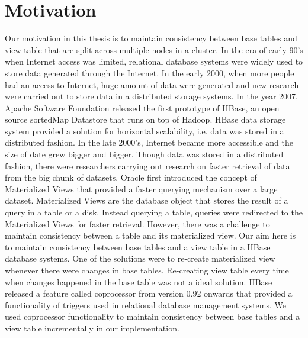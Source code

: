 \documentclass[11pt,a4paper,bibtotoc,idxtotoc,headsepline,footsepline,footexclude,BCOR12mm,DIV13]{scrbook}
\begin{document}

\section{Motivation}
\label{Motivation}

Our motivation in this thesis is to maintain consistency between base tables and view table that are split across multiple nodes in a cluster. In the era of early 90's when Internet access was limited, relational database systems were widely used to store data generated through the Internet. In the early 2000, when more people had an access to Internet, huge amount of data were generated and new research were carried out to store data in a distributed storage systems. In the year 2007, Apache Software Foundation released the first prototype of HBase, an open source sortedMap Datastore that runs on top of Hadoop. HBase data storage system provided a solution for horizontal scalability, i.e. data was stored in a distributed fashion. In the late 2000's, Internet became more accessible and the size of date grew bigger and bigger. Though data was stored in a distributed fashion, there were researchers carrying out research on faster retrieval of data from the big chunk of datasets. Oracle first introduced the concept of Materialized Views that provided a faster querying mechanism over a large dataset. Materialized Views are the database object that stores the result of a query in a
table or a disk. Instead querying a table, queries were redirected to the Materialized Views for faster retrieval. However, there was a challenge to maintain consistency between a table and its materialized view. Our aim here is to maintain consistency between base tables and a view table in a HBase database systems. One of the solutions were to re-create materialized view whenever there were changes in base tables. Re-creating view table every  time when changes happened in the base table was not a ideal solution. HBase released a feature called coprocessor from version 0.92 onwards that provided a functionality of triggers used in relational database management systems. We used coprocessor functionality to maintain consistency between base tables and a view table incrementally in our implementation.
\end{document}
